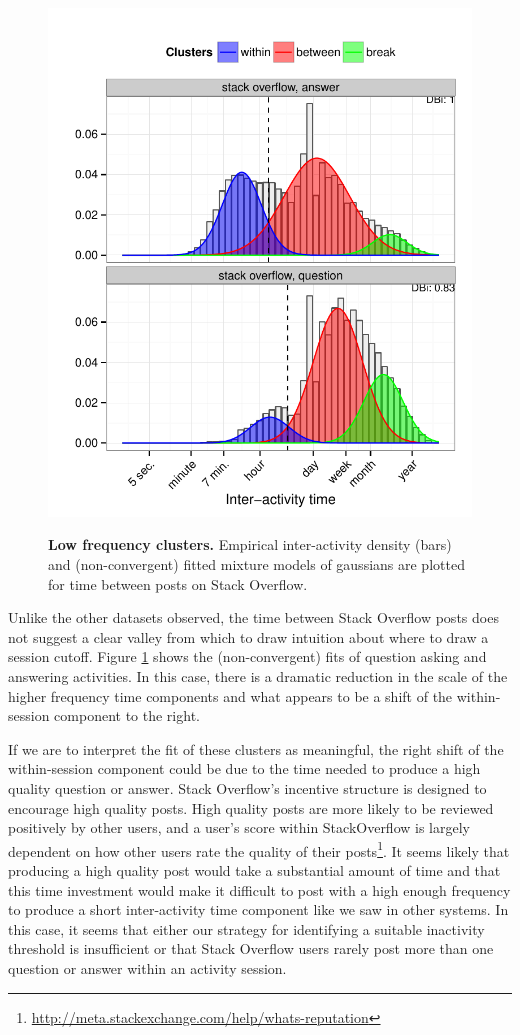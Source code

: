 \begin{figure}
\centering
\includegraphics[width=.45\textwidth]{figures/weird_so_clusters.pdf}
\label{fig:stack_overflow_clusters}
\caption{
    \textbf{Low frequency clusters.} Empirical inter-activity density (bars) and (non-convergent) fitted mixture models of gaussians are plotted for time between posts on Stack Overflow.
}
\end{figure}
Unlike the other datasets observed, the time between Stack Overflow posts does not suggest a clear valley from which to draw intuition about where to draw a session cutoff.  Figure \ref{fig:stack_overflow_clusters} shows the (non-convergent) fits of question asking and answering activities.  In this case, there is a dramatic reduction in the scale of the higher frequency time components and what appears to be a shift of the within-session component to the right.

If we are to interpret the fit of these clusters as meaningful, the right shift of the within-session component could be due to the time needed to produce a high quality question or answer.  Stack Overflow's incentive structure is designed to encourage high quality posts.  High quality posts are more likely to be reviewed positively by other users, and a user's score within StackOverflow is largely dependent on how other users rate the quality of their posts\footnote{\url{http://meta.stackexchange.com/help/whats-reputation}}.  It seems likely that producing a high quality post would take a substantial amount of time and that this time investment would make it difficult to post with a high enough frequency to produce a short inter-activity time component like we saw in other systems.  In this case, it seems that either our strategy for identifying a suitable inactivity threshold is insufficient or that Stack Overflow users rarely post more than one question or answer within an activity session.
